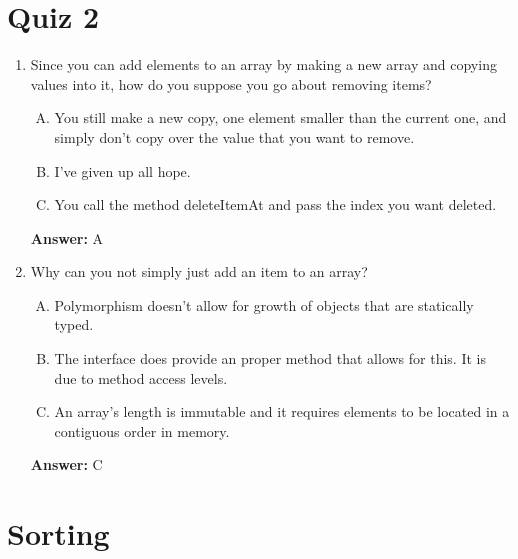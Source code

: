 \documentclass[12pt]{article}
\begin{document}
\bigskip

\section{Quiz 2}

\bigskip

\begin{enumerate}[1.]
    \item

    Since you can add elements to an array by making a new array and copying values into it, how do you suppose you go
    about removing items?

    \begin{enumerate}[A.]
        \item You still make a new copy, one element smaller than the current one, and simply don't copy over the value that you want to remove.
        \item I've given up all hope.
        \item You call the method deleteItemAt and pass the index you want deleted.
    \end{enumerate}

    \bigskip

    \textbf{Answer:} A

    \item

    Why can you not simply just add an item to an array?

    \bigskip

    \begin{enumerate}[A.]
        \item Polymorphism doesn't allow for growth of objects that are statically typed.
        \item The interface does provide an proper method that allows for this. It is due to method access levels.
        \item An array's length is immutable and it requires elements to be located in a contiguous order in memory.
    \end{enumerate}

    \bigskip

    \textbf{Answer:} C

\end{enumerate}

\bigskip

\section{Sorting}
\end{document}

